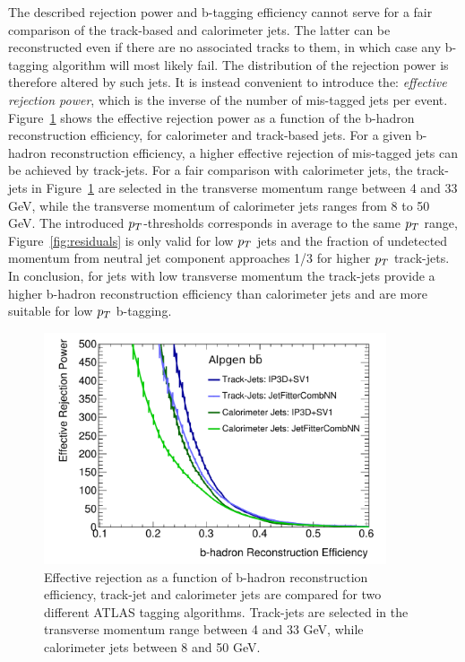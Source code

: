 The described rejection power and b-tagging efficiency cannot serve for a fair  comparison of the track-based and calorimeter jets.
The latter can be reconstructed even if there are no associated tracks to them, in which case any b-tagging algorithm will most likely fail.
The distribution of the rejection power is therefore altered by such jets. It is instead convenient to introduce 
the: \emph{effective rejection power}, which is the inverse of the number of mis-tagged jets per event. 
Figure~\ref{fig:cj_tj} shows the effective rejection power as a function of the b-hadron reconstruction efficiency, for 
calorimeter and track-based jets. For a given b-hadron reconstruction efficiency,
a higher effective rejection of mis-tagged jets can be achieved by track-jets.
For a fair comparison with calorimeter jets, the track-jets in Figure~\ref{fig:cj_tj} are selected in the transverse 
momentum range between 4 and 33 GeV, while the transverse momentum of calorimeter jets 
ranges from 8 to 50 GeV. The introduced $p_{T}$-thresholds corresponds in average to the same $p_{T}$ range, 
Figure~\ref{fig:residuals} is only valid for low $p_{T}$ jets  and the fraction of undetected 
momentum from neutral jet component  approaches 1/3 for higher $p_{T}$ track-jets.
In conclusion, for jets with low transverse momentum the track-jets provide a higher 
b-hadron reconstruction efficiency than calorimeter jets and are more suitable  for 
low $p_{T}$ b-tagging.

\begin{figure}[!b]
\centering
\includegraphics[width=0.9\textwidth]{figure/trackjet/eff_real_rej_mod2.pdf}
\caption{Effective rejection as a function of b-hadron reconstruction efficiency, track-jet and calorimeter jets are
	compared for two different ATLAS tagging algorithms. Track-jets are selected in the transverse momentum range 
	between 4 and 33 GeV, while calorimeter jets between 8 and 50 GeV.}
\label{fig:cj_tj}
\end{figure}    

